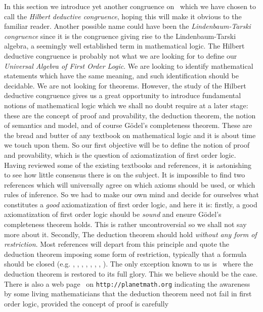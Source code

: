 In this section we introduce yet another congruence on \pv\ which we
have chosen to call the {\em Hilbert deductive congruence}, hoping
this will make it obvious to the familiar reader. Another possible
name could have been the {\em Lindenbaum-Tarski congruence} since it
is the congruence giving rise to the Lindenbaum-Tarski algebra, a
seemingly well established term in mathematical logic. The Hilbert
deductive congruence is probably not what we are looking for to
define our {\em Universal Algebra of First Order Logic}. We are
looking to identify mathematical statements which have the same
meaning, and such identification should be decidable. We are not
looking for theorems. However, the study of the Hilbert deductive
congruence gives us a great opportunity to introduce fundamental
notions of mathematical logic which we shall no doubt require at a
later stage: these are the concept of proof and provability, the
deduction theorem, the notion of semantics and model, and of course
G\"odel's completeness theorem. These are the bread and butter of
any textbook on mathematical logic and it is about time we touch
upon them. So our first objective will be to define the notion of
proof and provability, which is the question of axiomatization of
first order logic. Having reviewed some of the existing textbooks
and references, it is astonishing to see how little consensus there
is on the subject. It is impossible to find two references which
will universally agree on which axioms should be used, or which
rules of inference. So we had to make our own mind and decide for
ourselves what constitutes a {\em good} axiomatization of first
order logic, and here it is: firstly, a good axiomatization of first
order logic should be {\em sound} and ensure G\"odel's completeness
theorem holds. This is rather uncontroversial so we shall not say
more about it. Secondly, The deduction theorem should hold {\em
without any form of restriction}. Most references will depart from
this principle and quote the deduction theorem imposing some form of
restriction, typically that a formula should be closed (e.g.
\cite{Ferenczi}, \cite{Hoyois}, \cite{Johnstone}, \cite{Kunen},
\cite{Mendelson}, \cite{Monk}, \cite{Metamath}, \cite{Tourlakis}).
The only exception known to us is~\cite{AlgLog} where the deduction
theorem is restored to its full glory. This we believe should be the
case. There is also a web page~\cite{Planet} on
\texttt{http://planetmath.org} indicating the awareness by some
living mathematicians  that the deduction theorem need not fail in
first order logic, provided the concept of proof is carefully
